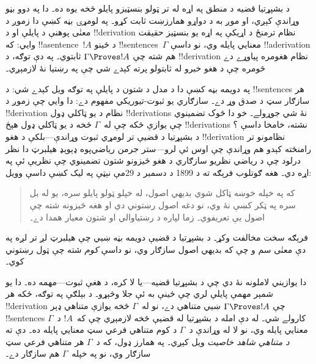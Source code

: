 \documentclass[../../../include/open-logic-section]{subfiles}
\begin{document}
      {}
      {}


د بشپړتيا قضيه د منطق په اړه له تر ټولو بنسټيزو پايلو څخه يوه ده۔
دا په دوو بڼو وړاندې کېږي، او موږ به د دواړو همارزښت ثابت کړو۔ په
لومړۍ بڼه کښې دا زموږ د معنٰی پوهنې د پايلې او د !!{derivation}
نظام ترمنځ د اړيکې په اړه يو بنسټيز حقيقت وايي: که
!!a{sentence}~$!A$ د ځينو !!{sentence}s~$\Gamma$ معنايي پايله
وي، نو داسې !!a{derivation} هم شته چې
$\Gamma \Proves !A$ ثابتوي۔ په دې توګه، د !!{derivation} نظام
هغومره پياوړے دے څومره چې د هغو خبرو له ثابتولو پرته کېدے شي چې
په رښتيا نۀ لازمېږي۔

په دويمه بڼه کښې دا د مدل د شتون د پايلې په توګه ويل کېدے شي: د
!!{sentence}s هر سازګار سټ د صدق وړ دے۔ سازګاري يو ثبوت-تيوريکي
مفهوم دے: دا وايي چې زموږ د !!{derivation} نظام د يو ټاکلي ډول
!!{derivation}s نۀ شي جوړولے۔ خو دا څوک تضمينوي چې يوازې ځکه چې
له~$\Gamma$ څخه د يو ټاکلي ډول هېڅ !!{derivation}s نشته، خامخا
داسې ؟ د بشپړتيا د
قضيې تر لومړي ثبوت وړاندې---بلکې د هغو !!{derivation} نظامونو تر
رامنځته کېدو هم وړاندې چې اوس ئې لرو---ستر جرمن رياضي‌پوه ډېوېډ
هيلبرټ دا نظر درلود چې د رياضي نظريو سازګاري د هغو څيزونو شتون
تضمينوي چې نظريې ئې په اړه دي۔ هغه ګوتلوب فرېګه ته د 1899 د دسمبر د 29مې نېټې په ليک کښې داسې وويل:
\begin{quote}
  که په خپله خوښه ټاکل شوي بديهي اصول، له خپلو ټولو پايلو سره،
  يو له بل سره په ټکر کښې نۀ وي، نو دغه اصول رښتوني دي او هغه
  څيزونه شته چې اصول يې تعريفوي۔ زما لپاره د رښتياوالي او شتون
  معيار همدا دے۔
\end{quote}
فرېګه سخت مخالفت وکړ۔ د بشپړتيا د قضيې دويمه بڼه ښيي چې هيلبرټ
لږ تر لږه په دې معنٰی سم و چې که بديهي اصول سازګار وي، نو داسې
\emph{کوم}
 شته چې ټول رښتوني کوي۔

دا يوازيني لاملونه نۀ دي چې د بشپړتيا قضيه---يا لا کره، د هغې
ثبوت---مهمه ده۔ دا يو شمېر مهمې پايلې لري چې ځينې به ئې جلا وڅېړو۔
د بېلګې په توګه، ځکه هر !!{derivation} چې
$\Gamma \Proves !A$ ښيي متناهي دے، نو له~$\Gamma$ څخه يوازې
متناهي ډېر !!{sentence}s کارولے شي۔ له دې امله د بشپړتيا له قضيې
څخه لازمېږي چې که~$!A$ د~$\Gamma$ معنايي پايله وي، نو لا له وړاندې
د~$\Gamma$ د کوم متناهي فرعي سټ معنايي پايله ده۔ دې ته
\emph{د متناهي شاهد خاصيت} ويل کېږي۔ په همارز ډول، که د~$\Gamma$
هر متناهي فرعي سټ سازګار وي، نو په خپله~$\Gamma$ هم سازګار دے۔
\end{document}
